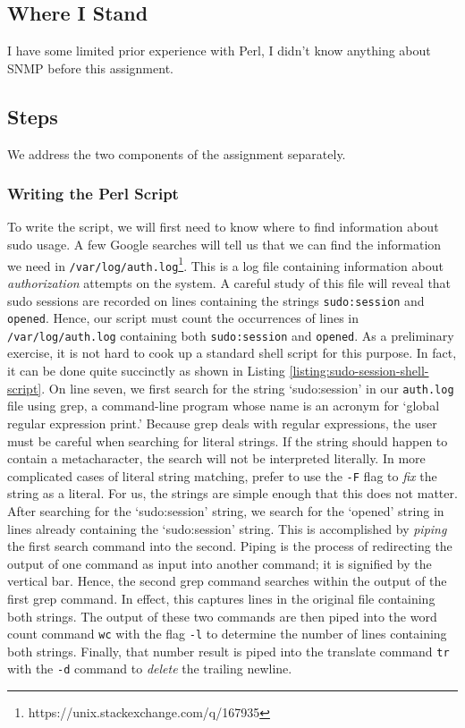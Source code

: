 \documentclass{article}
\begin{document}
\subsection{Where I Stand}

I have some limited prior experience with Perl, I didn't know anything about
SNMP before this assignment.


\subsection{Steps}

We address the two components of the assignment separately.

\subsubsection{Writing the Perl Script}

To write the script, we will first need to know where to find information about
sudo usage.  A few Google searches will tell us that we can find the information
we need in
%
\verb|/var/log/auth.log|\footnote{https://unix.stackexchange.com/q/167935}.
%
This is a log file containing information about \emph{authorization} attempts on
the system. A careful study of this file will reveal that sudo sessions are
recorded on lines containing the strings \verb|sudo:session| and \verb|opened|.
%
Hence, our script must count the occurrences of lines in
\verb|/var/log/auth.log| containing both \verb|sudo:session| and \verb|opened|.
%
As a preliminary exercise, it is not hard to cook up a standard shell script for
this purpose. In fact, it can be done quite succinctly as shown in Listing
\ref{listing:sudo-session-shell-script}.  On line seven, we first search for the
string `sudo:session' in our \verb|auth.log| file using grep, a command-line
program whose name is an acronym for `global regular expression print.' Because
grep deals with regular expressions, the user must be careful when searching for
literal strings. If the string should happen to contain a metacharacter, the
search will not be interpreted literally. In more complicated cases of literal
string matching, prefer to use the \verb|-F| flag to \emph{fix} the string as a
literal. For us, the strings are simple enough that this does not matter.  After
searching for the `sudo:session' string, we search for the `opened' string in
lines already containing the `sudo:session' string.  This is accomplished by
\emph{piping} the first search command into the second.  Piping is the process
of redirecting the output of one command as input into another command; it is
signified by the vertical bar. Hence, the second grep command searches within
the output of the first grep command. In effect, this captures lines in the
original file containing both strings.  The output of these two commands are
then piped into the word count command \verb|wc| with the flag \verb|-l| to
determine the number of lines containing both strings. Finally, that number
result is piped into the translate command \verb|tr| with the \verb|-d| command
to \emph{delete} the trailing newline.
\end{document}
